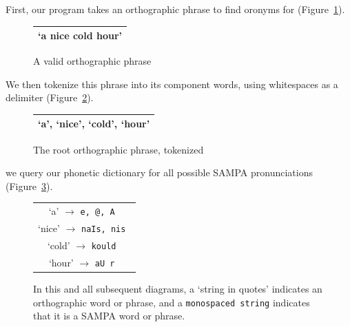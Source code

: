 First, our program takes an orthographic phrase to find oronyms for (Figure~\ref{fig:oronymGeneration:orthoPhraseInput}).

\begin{figure}[h]
\begin{center}
\begin{tabular}{|c|}
\hline
`a nice cold hour' \\
\hline
\end{tabular}
\captionfonts
\caption[Root oronym phrase]{A valid orthographic phrase}
\label{fig:oronymGeneration:orthoPhraseInput}
\end{center}
\end{figure}

We then tokenize this phrase into its component words, using whitespaces as a delimiter (Figure~\ref{fig:oronymGeneration:tokenizedInputOrthoPhraseWords}). 
\begin{figure}[h]
\begin{center}
\begin{tabular}{|c|}
\hline
`a', `nice', `cold', `hour' \\
\hline
\end{tabular}
\captionfonts
\caption[Tokenized root oronym phrase]{The root orthographic phrase, tokenized}
\label{fig:oronymGeneration:tokenizedInputOrthoPhraseWords}
\end{center}
\end{figure}


we query our phonetic dictionary for all possible SAMPA pronunciations (Figure~\ref{fig:oronymGeneration:queryDBwithOrthoWordForSampa}).

\begin{figure}[h]
\begin{center}
\begin{tabular}{|c|}

\hline
`a' $\rightarrow$  \tt{e}, \tt{@}, \tt{A} \\

`nice' $\rightarrow$   \tt{naIs}, \tt{nis} \\

`cold' $\rightarrow$  \tt{kould} \\

`hour' $\rightarrow$  \tt{aU\char18 r} \\
\hline
\end{tabular}
\captionfonts
\caption[queryDBwithOrthoWordForSampa example]{ In this and all subsequent diagrams, a `string in quotes' indicates an orthographic word or phrase, and a \texttt{monospaced string} indicates that it is a SAMPA word or phrase.  }
\label{fig:oronymGeneration:queryDBwithOrthoWordForSampa}
\end{center}
\end{figure}

